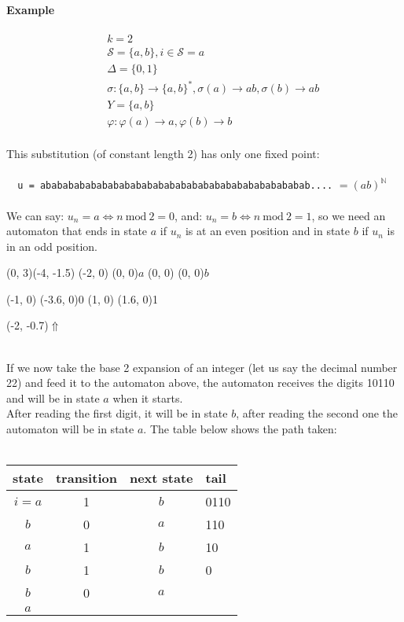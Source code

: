 \documentclass{article}
\begin{document}
\paragraph{Example}
\begin{eqnarray*} 
&&k = 2\\
&&\mathcal{S} = \{a, b\}, i \in \mathcal{S} = a\\
&&\Delta = \{0, 1\}\\
&&\sigma:\{a, b\} \rightarrow \{a, b\}^*, \sigma(a) \rightarrow ab,
\sigma(b) \rightarrow ab\\
&&Y = \{a, b\}\\
&&\varphi: \varphi(a) \rightarrow a, \varphi(b) \rightarrow b
\end{eqnarray*}
\\
This substitution (of constant length 2) has only one fixed point:\\
\\
\verb#  u = abababababababababababababababababababababababab....#
$= (ab)^\mathbb{N}$\\
\\
We can say: $u_n = a \Leftrightarrow n \mathrm{\ mod\ } 2 = 0$, and:
$u_n = b \Leftrightarrow n \mathrm{\ mod\ } 2 = 1$, so we need an automaton 
that ends in state $a$ if $u_n$ is at an even position and in state $b$ if 
$u_n$ is in an odd position.\\
\begin{graph}(0, 3)(-4, -1.5)
  (-2, 0) (0, 0){$a$}
  (0, 0)  (0, 0){$b$}

  (-1, 0) \freetext(-3.6, 0){0}
   
   
  (1, 0) \freetext(1.6, 0){1}

  \freetext(-2, -0.7){$\Uparrow$}
\end{graph}\\
If we now take the base 2 expansion of an integer (let us say the decimal 
number 22) and feed it to the automaton above, the automaton receives the 
digits 10110 and will be in state $a$ when it starts.\\
After reading the first digit, it will be in state $b$, after reading the 
second one the automaton will be in state $a$. The table below shows the path 
taken:\\
\\
\begin{tabular}{c|c|c|l} 
state & transition & next state & tail\\
\hline
$i=a$ & 1 & $b$ & 0110\\
$b$   & 0 & $a$ & 110\\
$a$   & 1 & $b$ & 10\\
$b$   & 1 & $b$ & 0\\
$b$   & 0 & $a$ & \\
$a$   &   &   & 
\end{tabular}\\
\end{document}
